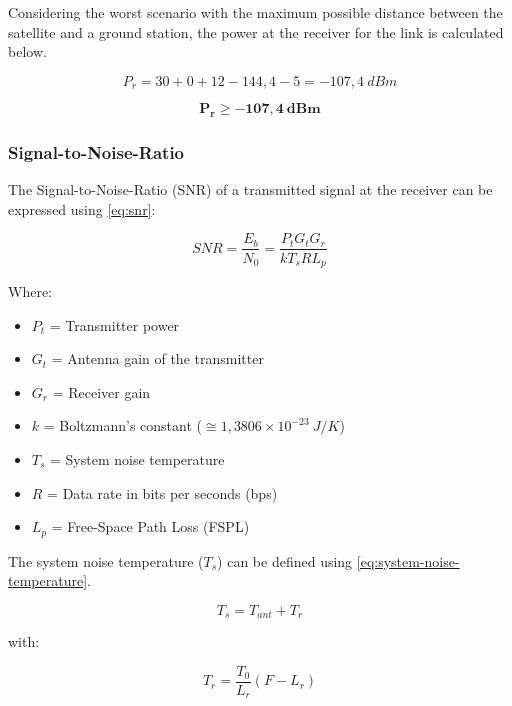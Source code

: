 Considering the worst scenario with the maximum possible distance between the satellite and a ground station, the power at the receiver for the link is calculated below.

\begin{equation}
    P_{r} = 30 + 0 + 12 - 144,4 - 5 = -107,4\ dBm
\end{equation}

\begin{equation}
    \mathbf{P_{r} \geq -107,4\ dBm}
\end{equation}

\subsubsection{Signal-to-Noise-Ratio}

The Signal-to-Noise-Ratio (SNR) of a transmitted signal at the receiver can be expressed using \autoref{eq:snr}:

\begin{equation} \label{eq:snr}
    SNR = \frac{E_{b}}{N_{0}} = \frac{P_{t}G_{t}G_{r}}{kT_{s}RL_{p}}
\end{equation}

Where:

\begin{itemize}
    \item $P_{t}$ = Transmitter power
    \item $G_{t}$ = Antenna gain of the transmitter
    \item $G_{r}$ = Receiver gain
    \item $k$ = Boltzmann's constant ($\cong 1,3806 \times 10^{-23}\ J/K$)
    \item $T_{s}$ = System noise temperature
    \item $R$ = Data rate in bits per seconds (bps)
    \item $L_{p}$ = Free-Space Path Loss (FSPL)
\end{itemize}

The system noise temperature ($T_{s}$) can be defined using \autoref{eq:system-noise-temperature}.

\begin{equation} \label{eq:system-noise-temperature}
    T_{s} = T_{ant} + T_{r}
\end{equation}

with:

\begin{equation} \label{eq:noise-temperature-receiver}
    T_{r} = \frac{T_{0}}{L_{r}} (F - L_{r})
\end{equation}


